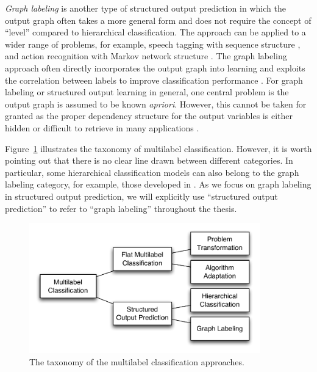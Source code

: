 \textit{Graph labeling} is another type of structured output prediction in which the output graph often takes a more general form and does not require the concept of ``level'' compared to hierarchical classification.
The approach can be applied to a wider range of problems, for example, speech tagging with sequence structure \citep{collins02a}, and action recognition with Markov network structure \citep{Wang11hidden}. 
The graph labeling approach often directly incorporates the output graph into learning and exploits the correlation between labels to improve classification performance \citep{collins02a,lafferty01,taskar02,Taskar04max,THJA04,Rousu07}.
For graph labeling or structured output learning in general, one central problem is the output graph is assumed to be known \textit{apriori}.
However, this cannot be taken for granted as the proper dependency structure for the output variables is either hidden or difficult to retrieve in many applications \citep{Chickering94learning}.

Figure~\ref{multilabel_taxonomy} illustrates the taxonomy of multilabel classification.
However, it is worth pointing out that there is no clear line drawn between different categories.
In particular, some hierarchical classification models can also belong to the graph labeling category, for example, those developed in \citep{THJA04,Rousu06}.
As we focus on graph labeling in structured output prediction, we will explicitly use ``structured output prediction'' to refer to ``graph labeling'' throughout the thesis.

\begin{figure}
\begin{center}
	\centering
	\includegraphics[width=10cm]{./taxonomy.pdf}
	\caption{The taxonomy of the multilabel classification approaches.}
	\label{multilabel_taxonomy}
\end{center}
\end{figure}

